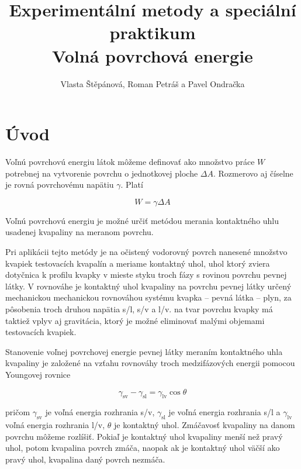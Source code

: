 \documentclass[12pt]{article}
\begin{document}
\title{Experimentální metody a speciální praktikum \\
Volná povrchová energie}
\author{Vlasta Štěpánová, Roman Petráš a Pavel Ondračka}
\maketitle

\section{Úvod}
Voľnú povrchovú energiu látok môžeme definovať ako množstvo práce $W$ potrebnej na vytvorenie povrchu o jednotkovej ploche $\Delta A$. Rozmerovo aj číselne je rovná povrchovému napätiu $\gamma$. Platí 

\begin{equation}
W = \gamma \Delta A
\end{equation}
			
Voľnú povrchovú energiu je možné určiť metódou merania kontaktného uhlu usadenej kvapaliny na meranom povrchu.

Pri aplikácii tejto metódy je na očistený vodorovný povrch nanesené množstvo kvapiek testovacích kvapalín a meriame kontaktný uhol, uhol ktorý zviera dotyčnica k profilu kvapky v mieste styku troch fázy s rovinou povrchu pevnej látky. V rovnováhe je kontaktný uhol kvapaliny na povrchu pevnej látky určený mechanickou mechanickou rovnováhou systému kvapka – pevná látka – plyn, za pôsobenia troch druhou napätia s/l, s/v a l/v. na tvar povrchu kvapky má taktiež vplyv aj gravitácia, ktorý je možné eliminovať malými objemami testovacích kvapiek.

Stanovenie voľnej povrchovej energie pevnej látky meraním kontaktného uhla kvapaliny je založené na vzťahu rovnováhy troch medzifázových energii pomocou Youngovej rovnice

\begin{equation}
\gamma_\mathrm{sv} - \gamma_\mathrm{sl} = \gamma_\mathrm{lv} \cos{\theta}
\end{equation}

pričom $\gamma_\mathrm{sv}$ je voľná energia rozhrania s/v, $\gamma_\mathrm{sl}$ je voľná energia rozhrania s/l a $\gamma_\mathrm{lv}$  voľná energia rozhrania l/v, $\theta$ je kontaktný uhol.
Zmáčavosť kvapaliny na danom povrchu môžeme rozlíšiť. Pokiaľ je kontaktný uhol kvapaliny menší než pravý uhol, potom kvapalina povrch zmáča, naopak ak je kontaktný uhol väčší ako pravý uhol, kvapalina daný povrch nezmáča.
\end{document}
